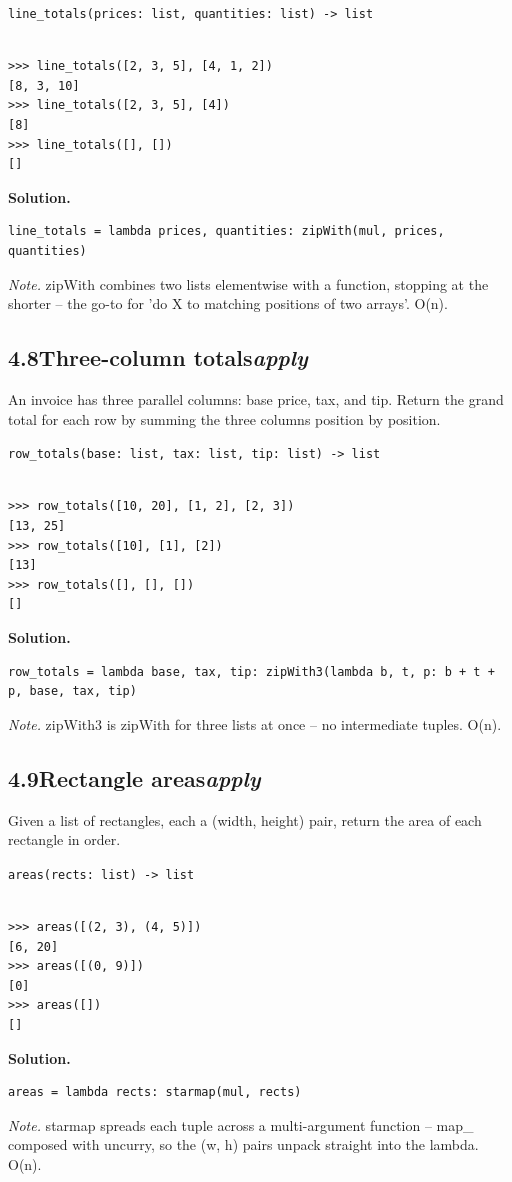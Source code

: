 \documentclass[10pt,letterpaper]{book}
\begin{document}
\noindent\texttt{line\_totals(prices: list, quantities: list) -> list}
\begin{lstlisting}[style=ex]

>>> line_totals([2, 3, 5], [4, 1, 2])
[8, 3, 10]
>>> line_totals([2, 3, 5], [4])
[8]
>>> line_totals([], [])
[]

\end{lstlisting}
\noindent\textbf{Solution.}
\begin{lstlisting}[style=code]
line_totals = lambda prices, quantities: zipWith(mul, prices, quantities)
\end{lstlisting}
\noindent\textit{Note.} zipWith combines two lists elementwise with a function, stopping at the shorter -- the go-to for 'do X to matching positions of two arrays'. O(n).

\subsection*{4.8\quad Three-column totals\hfill\textnormal{\textit{apply}}}
An invoice has three parallel columns: base price, tax, and tip. Return the grand total for each row by summing the three columns position by position.

\noindent\texttt{row\_totals(base: list, tax: list, tip: list) -> list}
\begin{lstlisting}[style=ex]

>>> row_totals([10, 20], [1, 2], [2, 3])
[13, 25]
>>> row_totals([10], [1], [2])
[13]
>>> row_totals([], [], [])
[]

\end{lstlisting}
\noindent\textbf{Solution.}
\begin{lstlisting}[style=code]
row_totals = lambda base, tax, tip: zipWith3(lambda b, t, p: b + t + p, base, tax, tip)
\end{lstlisting}
\noindent\textit{Note.} zipWith3 is zipWith for three lists at once -- no intermediate tuples. O(n).

\subsection*{4.9\quad Rectangle areas\hfill\textnormal{\textit{apply}}}
Given a list of rectangles, each a (width, height) pair, return the area of each rectangle in order.

\noindent\texttt{areas(rects: list) -> list}
\begin{lstlisting}[style=ex]

>>> areas([(2, 3), (4, 5)])
[6, 20]
>>> areas([(0, 9)])
[0]
>>> areas([])
[]

\end{lstlisting}
\noindent\textbf{Solution.}
\begin{lstlisting}[style=code]
areas = lambda rects: starmap(mul, rects)
\end{lstlisting}
\noindent\textit{Note.} starmap spreads each tuple across a multi-argument function -- map\_ composed with uncurry, so the (w, h) pairs unpack straight into the lambda. O(n).
\end{document}
